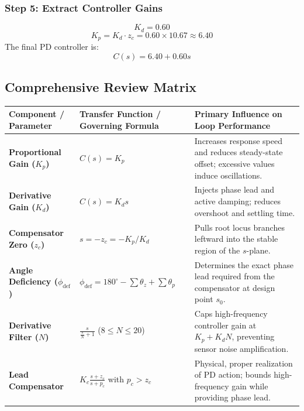 \documentclass[12pt,onecolumn,twoside ]{article}
\begin{document}
	\subsubsection{Step 5: Extract Controller Gains}
	\[
	K_d = 0.60
	\] \[
	K_p = K_d \cdot z_c = 0.60 \times 10.67 \approx 6.40
	\] The final PD controller is: \[
	C(s) = 6.40 + 0.60 s
	\]
	
	\subsection{Comprehensive Review Matrix}
	\begin{center}\small\begin{tabularx}{\textwidth}{L{0.8} L{0.8} L{1.4}}
			\toprule
			\textbf{Component / Parameter} & \textbf{Transfer Function / Governing Formula} & \textbf{Primary Influence on Loop Performance} \\
			\midrule
			\textbf{Proportional Gain ($K_p$)} & $C(s) = K_p$ & Increases response speed and reduces steady-state offset; excessive values induce oscillations. \\
			\textbf{Derivative Gain ($K_d$)} & $C(s) = K_d s$ & Injects phase lead and active damping; reduces overshoot and settling time. \\
			\textbf{Compensator Zero ($z_c$)} & $s = -z_c = -K_p / K_d$ & Pulls root locus branches leftward into the stable region of the $s$-plane. \\
			\textbf{Angle Deficiency ($\phi_{\text{def}}$)} & $\phi_{\text{def}} = 180^\circ - \sum \theta_z + \sum \theta_p$ & Determines the exact phase lead required from the compensator at design point $s_0$. \\
			\textbf{Derivative Filter ($N$)} & $\frac{s}{\frac{s}{N} + 1}$ ($8 \le N \le 20$) & Caps high-frequency controller gain at $K_p + K_d N$, preventing sensor noise amplification. \\
			\textbf{Lead Compensator} & $K_c \frac{s + z_c}{s + p_c}$ with $p_c > z_c$ & Physical, proper realization of PD action; bounds high-frequency gain while providing phase lead. \\
			\bottomrule
	\end{tabularx}\end{center}
	
\end{document}

